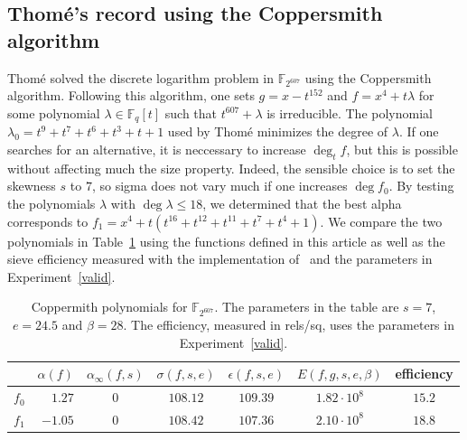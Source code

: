 \documentclass[a4wide]{article}
\newcommand{\F}{{\mathbb F}}
\theoremstyle{plain}
\theoremstyle{definition}
\theoremstyle{remark}
\begin{document}
\subsection{Thom\'e's record using the Coppersmith algorithm}
Thomé \cite{Tho03} solved the discrete logarithm problem in $\F_{2^{607}}$
using the Coppersmith algorithm. Following this algorithm, one sets
$g=x-t^{152}$ and $f=x^4+t\lambda$ for some polynomial $\lambda\in\F_q[t]$ such that
$t^{607}+\lambda$ is irreducible. The polynomial
$\lambda_0=t^9+t^7+t^6+t^3+t+1$ used by Thomé minimizes the degree of
$\lambda$. If one searches for an alternative, it is neccessary to increase
$\deg_t f$, but this is possible without affecting much the size property.
Indeed, the sensible choice is to set the skewness $s$ to $7$, so sigma does not
vary much if one increases $\deg f_0$. By testing the polynomials $\lambda$
with $\deg \lambda \leq 18$, we determined that the best alpha corresponds to
$f_1=x^4+t(t^{16} + t^{12} + t^{11} + t^7 + t^4 + 1)$. We compare the two
polynomials in Table~\ref{table} using the functions defined in this article
as well as the sieve efficiency measured with the implementation
of~\cite{DeGaVi12} and the parameters
in Experiment~\ref{valid}.
\begin{table}
	\begin{center}
	\begin{tabular}{|c|rccccc|}
	\hline	               & $\alpha(f)$ & $\alpha_\infty(f,s)$ &
		  $\sigma(f,s,e)$ & $\epsilon(f,s,e)$ &
		       $E(f,g,s,e,\beta)$& efficiency\\
		\hline
		$f_0$ &$1.27$  & $0$ & $108.12$   &$109.39$ & $1.82\cdot10^8$   & $15.2$\\
	 $f_1$ &$-1.05$ & $0$ & $108.42$   &$107.36$ & $2.10\cdot 10^8$ & $18.8$\\
		\hline
	\end{tabular}
\end{center}
\caption{Coppermith polynomials for $\F_{2^{607}}$. The parameters in the
	table are
$s=7$, $e=24.5$ and $\beta=28$. The efficiency, measured in rels/sq, uses the
parameters in Experiment~\ref{valid}.}
\label{table}
\end{table}
\end{document}

